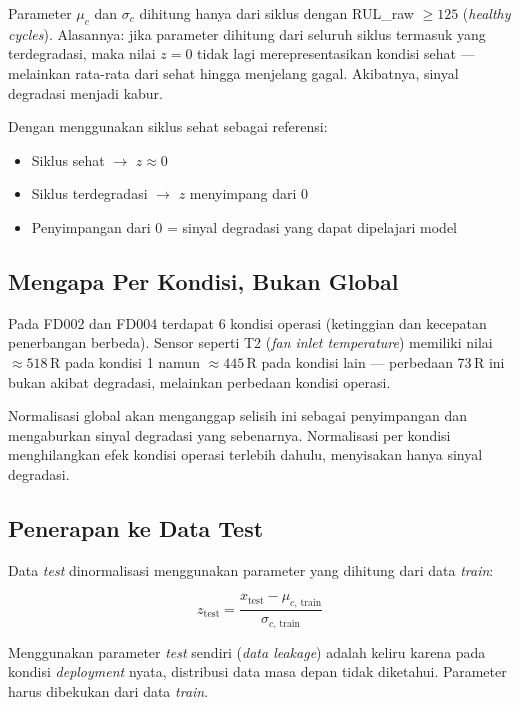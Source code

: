 \documentclass[11pt,a4paper]{article}
\begin{document}
Parameter $\mu_c$ dan $\sigma_c$ dihitung hanya dari siklus dengan
RUL\_raw $\geq 125$ (\textit{healthy cycles}).
Alasannya: jika parameter dihitung dari seluruh siklus termasuk yang
terdegradasi, maka nilai $z = 0$ tidak lagi merepresentasikan kondisi sehat
--- melainkan rata-rata dari sehat hingga menjelang gagal. Akibatnya, sinyal
degradasi menjadi kabur.

Dengan menggunakan siklus sehat sebagai referensi:
\begin{itemize}[noitemsep]
  \item Siklus sehat $\rightarrow$ $z \approx 0$
  \item Siklus terdegradasi $\rightarrow$ $z$ menyimpang dari 0
  \item Penyimpangan dari 0 = sinyal degradasi yang dapat dipelajari model
\end{itemize}

\subsection{Mengapa Per Kondisi, Bukan Global}

Pada FD002 dan FD004 terdapat 6 kondisi operasi (ketinggian dan kecepatan
penerbangan berbeda). Sensor seperti T2 (\textit{fan inlet temperature}) memiliki
nilai $\approx 518$\,R pada kondisi 1 namun $\approx 445$\,R pada kondisi lain
--- perbedaan 73\,R ini bukan akibat degradasi, melainkan perbedaan kondisi
operasi.

Normalisasi global akan menganggap selisih ini sebagai penyimpangan
dan mengaburkan sinyal degradasi yang sebenarnya. Normalisasi per kondisi
menghilangkan efek kondisi operasi terlebih dahulu, menyisakan hanya sinyal
degradasi.

\subsection{Penerapan ke Data Test}

Data \textit{test} dinormalisasi menggunakan parameter yang dihitung dari
data \textit{train}:

\begin{equation}
  z_{\text{test}} = \frac{x_{\text{test}} - \mu_{c,\,\text{train}}}{\sigma_{c,\,\text{train}}}
\end{equation}

Menggunakan parameter \textit{test} sendiri (\textit{data leakage}) adalah keliru
karena pada kondisi \textit{deployment} nyata, distribusi data masa depan tidak
diketahui. Parameter harus dibekukan dari data \textit{train}.
\end{document}
